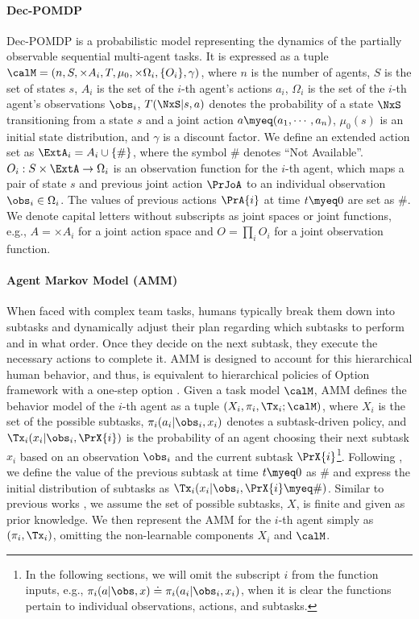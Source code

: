 \paragraph{Dec-POMDP} Dec-POMDP is a probabilistic model representing the dynamics of the partially observable sequential multi-agent tasks. It is expressed as a tuple $\calM = (n, S,\times A_i, T, \mu_0, \times \Omega_i, \{O_i\}, \gamma)$, where $n$ is the number of agents, $S$ is the set of states $s$, $A_i$ is the set of the $i$-th agent's actions $a_i$, $\Omega_i$ is the set of the $i$-th agent's observations $\obs_i$, $T(\NxS|s, a)$ denotes the probability of a state $\NxS$ transitioning from a state $s$ and a joint action $a\myeq(a_1, \cdots, a_n)$, $\mu_0(s)$ is an initial state distribution, and $\gamma$ is a discount factor. 
We define an extended action set as $\ExtA_i=A_i \cup \{\#\}$, where the symbol $\#$ denotes ``Not Available''.
$O_i:S \times \ExtA \rightarrow \Omega_i$ is an observation function for the $i$-th agent, which maps a pair of state $s$ and previous joint action $\PrJoA$ to an individual observation $\obs_i \in \Omega_i$. 
The values of previous actions $\PrA{i}$ at time $t\myeq 0$ are set as $\#$.
We denote capital letters without subscripts as joint spaces or joint functions, e.g., $A=\times A_i$ for a joint action space and $O=\prod_i O_i$ for a joint observation function.

\paragraph{Agent Markov Model (AMM)} 
When faced with complex team tasks, humans typically break them down into subtasks and dynamically adjust their plan regarding which subtasks to perform and in what order. Once they decide on the next subtask, they execute the necessary actions to complete it. 
AMM is designed to account for this hierarchical human behavior, and thus, is equivalent to hierarchical policies of Option framework with a one-step option \cite{sutton1999between, jing2021adversarial}.
Given a task model $\calM$, AMM defines the behavior model of the $i$-th agent as a tuple $(X_i, \pi_i, \Tx_i; \calM)$, where $X_i$ is the set of the possible subtasks, $\pi_i(a_i|\obs_i, x_i)$ denotes a subtask-driven policy, and $\Tx_i(x_i|\obs_i, \PrX{i})$ is the probability of an agent choosing their next subtask $x_i$ based on an observation $\obs_i$ and the current subtask $\PrX{i}$\footnote{In the following sections, we will omit the subscript $i$ from the function inputs, e.g., $\pi_i(a|\obs, x) \doteq \pi_i(a_i|\obs_i, x_i)$, when it is clear the functions pertain to individual observations, actions, and subtasks.}.
Following \cite{jing2021adversarial}, we define the value of the previous subtask at time $t\myeq 0$ as $\#$ and express the initial distribution of subtasks as $\Tx_i(x_i|\obs_i,\PrX{i}\myeq\#)$. Similar to previous works  \cite{jing2021adversarial,seo2022semi}, we assume the set of possible subtasks, $X$, is finite and given as prior knowledge. We then represent the AMM for the $i$-th agent simply as $(\pi_i, \Tx_i)$, omitting the non-learnable components $X_i$ and $\calM$.


